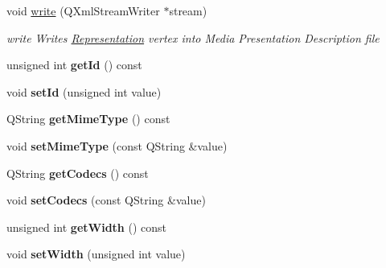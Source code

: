 \begin{DoxyCompactItemize}
\item 
void \hyperlink{class_representation_a0befd1aad26c098b99070a59a4d5b10e}{write} (Q\-Xml\-Stream\-Writer $\ast$stream)
\begin{DoxyCompactList}\small\item\em write Writes \hyperlink{class_representation}{Representation} vertex into Media Presentation Description file \end{DoxyCompactList}\item 
\hypertarget{class_representation_afd732c9b77d61d051cb2f4e6dfc1f3b5}{unsigned int {\bfseries get\-Id} () const }\label{class_representation_afd732c9b77d61d051cb2f4e6dfc1f3b5}

\item 
\hypertarget{class_representation_aed538f97ef8c89ed0b30113454cbd73f}{void {\bfseries set\-Id} (unsigned int value)}\label{class_representation_aed538f97ef8c89ed0b30113454cbd73f}

\item 
\hypertarget{class_representation_a93772fa1b471c4b12bad64f8ab0846a3}{Q\-String {\bfseries get\-Mime\-Type} () const }\label{class_representation_a93772fa1b471c4b12bad64f8ab0846a3}

\item 
\hypertarget{class_representation_a1c2eb5b39b782c60880f0f06ae977837}{void {\bfseries set\-Mime\-Type} (const Q\-String \&value)}\label{class_representation_a1c2eb5b39b782c60880f0f06ae977837}

\item 
\hypertarget{class_representation_a4b1e758aa922f79e52b80311de331230}{Q\-String {\bfseries get\-Codecs} () const }\label{class_representation_a4b1e758aa922f79e52b80311de331230}

\item 
\hypertarget{class_representation_ae2837ad052b1abe3bcd4afb2b2b1330b}{void {\bfseries set\-Codecs} (const Q\-String \&value)}\label{class_representation_ae2837ad052b1abe3bcd4afb2b2b1330b}

\item 
\hypertarget{class_representation_a76da401a3b97174efb92e8fdccc560c5}{unsigned int {\bfseries get\-Width} () const }\label{class_representation_a76da401a3b97174efb92e8fdccc560c5}

\item 
\hypertarget{class_representation_ac92413acf846b60ea0f314eac991f00f}{void {\bfseries set\-Width} (unsigned int value)}\label{class_representation_ac92413acf846b60ea0f314eac991f00f}


\end{DoxyCompactItemize}
